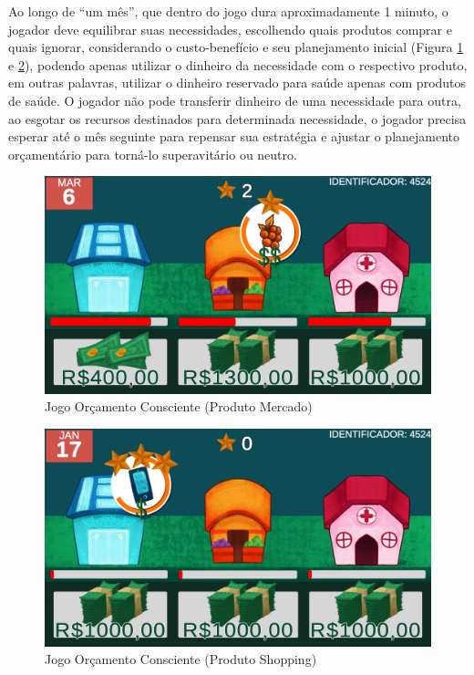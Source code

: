 Ao longo de “um mês”, que dentro do jogo dura aproximadamente 1 minuto, o jogador deve equilibrar suas necessidades, escolhendo quais produtos comprar e quais ignorar, considerando o custo-benefício e seu planejamento inicial (Figura \ref{fig: figura03-mercado} e \ref{fig: figura04-shopping}), podendo apenas utilizar o dinheiro da necessidade com o respectivo produto, em outras palavras, utilizar o dinheiro reservado para saúde apenas com produtos de saúde. O jogador não pode transferir dinheiro de uma necessidade para outra, ao esgotar os recursos destinados para determinada necessidade, o jogador precisa esperar até o mês seguinte para repensar sua estratégia e ajustar o planejamento orçamentário para torná-lo superavitário ou neutro.

\graphicspath{{figuras/}}
\begin{figure}[!ht]
\centering
\begin{minipage}{1\linewidth}
\centering
\caption{Jogo Orçamento Consciente (Produto Mercado)} \label{fig: figura03-mercado}
\includegraphics[width=0.4\linewidth]{03-figura_tela-jogo-mercado.png}
\end{minipage}
\end{figure}

\graphicspath{{figuras/}}
\begin{figure}[!ht]
\centering
\begin{minipage}{1\linewidth}
\centering
\caption{Jogo Orçamento Consciente (Produto Shopping)} \label{fig: figura04-shopping}
\includegraphics[width=0.4\linewidth]{04-figura_tela-jogo-shopping.png}
\end{minipage}
\end{figure}

